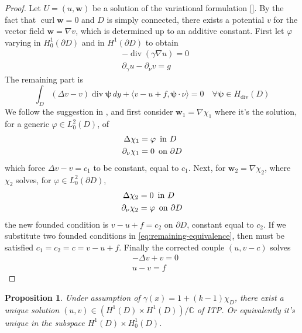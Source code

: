 \documentclass[10pt, a4paper, twoside, openright]{book}
\theoremstyle{definition}
\theoremstyle{plain}
\theoremstyle{plain}
\theoremstyle{plain}
\newtheorem{proposition}[subsection]{Proposition}
\theoremstyle{plain}
\theoremstyle{plain}
\theoremstyle{plain}
\theoremstyle{plain}
\theoremstyle{plain}
\DeclareMathOperator{\divergence}{div}
\DeclareMathOperator{\curl}{curl}
\let\phi\varphi
\begin{document}
\begin{proof}
 Let $U=(u, \bm w)$ be a solution of the variational formulation \ref{}. By the fact that $\curl \bm w=0$ and $D$ is simply connected, there exists a potential $v$ for the vector field $\bm w = \nabla v$, which is determined up to an additive constant. First let $\phi$ varying in $H^1_0(\partial D)$ and in $H^1(\partial D)$ to obtain
 \begin{align}
  & -\divergence(\gamma\nabla u)=0 \\
  & \partial_\gamma u - \partial_\nu v= g
 \end{align}
 The remaining part is
 \begin{equation}
 \label{eq:remaining-equivalence}
  \int_D(\Delta v - v)\divergence\bm\psi\, dy + \langle v-u + f,\bm\psi\cdot\nu\rangle = 0 \quad \forall\bm\psi\in H_{\divergence}(D)
 \end{equation}
We follow the suggestion in \cite{cakoni-colton-haddar:lsm}, and first consider $\bm w_1 = \nabla \chi_1 $ where it's the solution, for a generic $\phi \in L^2_0(D)$, of
\begin{align}
 \Delta \chi_1 &= \phi \, \textup{ in }D\\
 \partial_\nu \chi_1 &= 0\, \textup{ on }\partial D
\end{align}
which force $\Delta v - v = c_1$ to be constant, equal to $c_1$. Next, for $\bm w_2 = \nabla\chi_2$, where $\chi_2$ solves, for $\phi\in L^2_0(\partial D)$,
\begin{align}
 \Delta \chi_2 &= 0 \, \textup{ in }D\\
 \partial_\nu \chi_2 &= \phi\, \textup{ on }\partial D
\end{align}
the new founded condition is $v-u+f=c_2$ on $\partial D$, constant equal to $c_2$. 
If we substitute two founded conditions in \ref{eq:remaining-equivalence}, then must be satisfied $c_1=c_2=c=v-u+f$. Finally the corrected couple $(u,v-c)$ solves
 \begin{align}
  & - \Delta v + v=0 \\
  & u-v = f
 \end{align}
\end{proof}
\begin{proposition}
\label{prop:ITP-ex-un}
 Under assumption of $\gamma(x)=1+(k-1)\chi_D$, there exist a unique solution $(u,v)\in(H^1(D) \times H^1(D))/\mathbb{C}$ of ITP. Or equivalently it's unique in the subspace $H^1(D)\times H^1_0(D)$.
\end{proposition}
\end{document}
